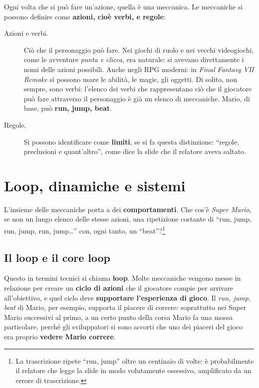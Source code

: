 Ogni volta che si può fare un'azione, quella è una meccanica. Le meccaniche si
possono definire come \textbf{azioni, cioè verbi, e regole}:
\begin{description}
  \item[Azioni e verbi.] Ciò che il personaggio può fare. Nei giochi di ruolo e
        nei vecchi videogiochi, come le avventure \emph{punta e clicca}, era
        naturale: si avevano direttamente i nomi delle azioni possibili. Anche
        negli RPG moderni: in \emph{Final Fantasy VII Remake} si possono usare le
        abilità, le magie, gli oggetti. Di solito, non sempre, sono verbi: l'elenco
        dei verbi che rappresentano ciò che il giocatore può fare attraverso il
        personaggio è già un elenco di meccaniche. Mario, di base, può
        \textbf{run, jump, beat}.
  \item[Regole.] Si possono identificare come \textbf{limiti}, se si fa questa
        distinzione: ``regole, preclusioni e quant'altro'', come dice la slide
        che il relatore aveva saltato.
\end{description}

\section{Loop, dinamiche e sistemi}
\label{sec:z6-dinamiche}

L'insieme delle meccaniche porta a dei \textbf{comportamenti}. Che cos'è
\emph{Super Mario}, se non un lungo elenco delle stesse azioni, una ripetizione
costante di ``run, jump, run, jump, run, jump\dots{}'' con, ogni tanto, un
``beat''?\footnote{La trascrizione ripete ``run, jump'' oltre un centinaio di
volte: è probabilmente il relatore che legge la slide in modo volutamente
ossessivo, amplificato da un errore di trascrizione.}

\subsection{Il loop e il core loop}

Questo in termini tecnici si chiama \textbf{loop}. Molte meccaniche vengono messe
in relazione per creare un \textbf{ciclo di azioni} che il giocatore compie per
arrivare all'obiettivo, e quel ciclo deve \textbf{supportare l'esperienza di
gioco}. Il \emph{run, jump, beat} di Mario, per esempio, supporta il piacere di
correre: soprattutto nei Super Mario successivi al primo, a un certo punto della
corsa Mario fa una mossa particolare, perché gli sviluppatori si sono accorti che
uno dei piaceri del gioco era proprio \textbf{vedere Mario correre}.


